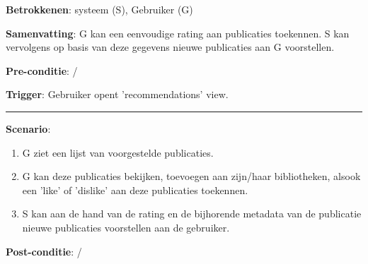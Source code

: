 \noindent \textbf{Betrokkenen}: systeem (S), Gebruiker (G)
\vspace{2 mm}

\noindent \textbf{Samenvatting}: G kan een eenvoudige rating aan publicaties toekennen. S kan vervolgens op basis van deze gegevens nieuwe publicaties aan G voorstellen. 
\vspace{2 mm}

\noindent \textbf{Pre-conditie}: /
\vspace{2 mm}

\noindent \textbf{Trigger}: Gebruiker opent 'recommendations' view.
\vspace{4 mm}

\hrule
\vspace{2 mm}
\noindent \textbf{Scenario}:
\begin{enumerate}
\item G ziet een lijst van voorgestelde publicaties.
\item G kan deze publicaties bekijken, toevoegen aan zijn/haar bibliotheken, alsook een 'like' of 'dislike' aan deze publicaties toekennen. 
\item S kan aan de hand van de rating en de bijhorende metadata van de publicatie nieuwe publicaties voorstellen aan de gebruiker. 
\end{enumerate}
\noindent \textbf{Post-conditie}: / \\



\clearpage





